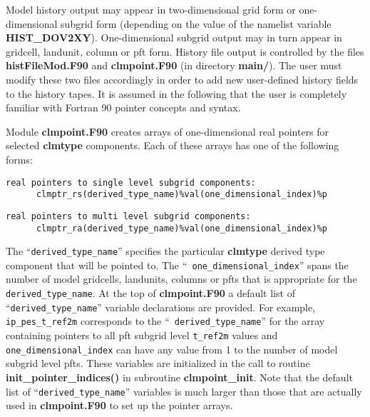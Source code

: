 Model history output may appear in two-dimensional grid form or
one-dimensional subgrid form (depending on the value of the namelist
variable {\bf HIST\_DOV2XY}).  One-dimensional subgrid output may in
turn appear in gridcell, landunit, column or pft form.  History file
output is controlled by the files {\bf histFileMod.F90} and {\bf
clmpoint.F90} (in directory {\bf main/}).  The user must modify these
two files accordingly in order to add new user-defined history fields
to the history tapes. It is assumed in the following that the user is
completely familiar with Fortran 90 pointer concepts and syntax.

Module {\bf clmpoint.F90} creates arrays of one-dimensional real
pointers for selected {\bf clmtype} components.
Each of these arrays has one of the following forms:
\begin{verbatim}
real pointers to single level subgrid components:  
      clmptr_rs(derived_type_name)%val(one_dimensional_index)%p  
\end{verbatim}

\begin{verbatim}
real pointers to multi level subgrid components:  
      clmptr_ra(derived_type_name)%val(one_dimensional_index)%p
\end{verbatim}

The ``{\tt derived\_type\_name}'' specifies the particular {\bf
clmtype} derived type component that will be pointed to.  The ``{\tt
one\_dimensional\_index}'' spans the number of model gridcells,
landunits, columns or pfts that is appropriate for the {\tt
derived\_type\_name}.  At the top of {\bf clmpoint.F90} a default list
of ``{\tt derived\_type\_name}'' variable declarations are provided.
For example, {\tt ip\_pes\_t\_ref2m} corresponds to the ``{\tt
derived\_type\_name}'' for the array containing pointers to all pft
subgrid level {\tt t\_ref2m} values and {\tt one\_dimensional\_index}
can have any value from 1 to the number of model subgrid level
pfts. These variables are initialized in the call to routine
{\bf init\_pointer\_indices()} in subroutine {\bf clmpoint\_init}.
Note that the default list of ``{\tt derived\_type\_name}''
variables is much larger than those that are actually used in {\bf
clmpoint.F90} to set up the pointer arrays.


